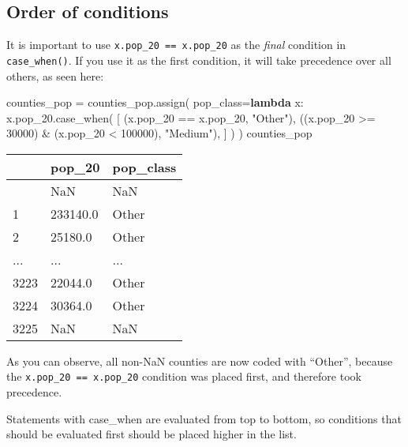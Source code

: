 \documentclass[
  letterpaper,
  DIV=11,
  numbers=noendperiod]{scrreprt}
\newenvironment{Shaded}{\begin{snugshade}}{\end{snugshade}}
\newcommand{\DecValTok}[1]{\textcolor[rgb]{0.68,0.00,0.00}{#1}}
\newcommand{\KeywordTok}[1]{\textcolor[rgb]{0.00,0.23,0.31}{\textbf{#1}}}
\newcommand{\NormalTok}[1]{\textcolor[rgb]{0.00,0.23,0.31}{#1}}
\newcommand{\OperatorTok}[1]{\textcolor[rgb]{0.37,0.37,0.37}{#1}}
\newcommand{\StringTok}[1]{\textcolor[rgb]{0.13,0.47,0.30}{#1}}
\begin{document}
\begin{tcolorbox}[enhanced jigsaw, colframe=quarto-callout-caution-color-frame, opacityback=0, titlerule=0mm, bottomrule=.15mm, breakable, leftrule=.75mm, colbacktitle=quarto-callout-caution-color!10!white, title=\textcolor{quarto-callout-caution-color}{\faFire}\hspace{0.5em}{Watch Out}, rightrule=.15mm, coltitle=black, opacitybacktitle=0.6, colback=white, left=2mm, arc=.35mm, toptitle=1mm, bottomtitle=1mm, toprule=.15mm]

\subsection{Order of conditions}\label{order-of-conditions}

It is important to use \texttt{x.pop\_20\ ==\ x.pop\_20} as the
\emph{final} condition in \texttt{case\_when()}. If you use it as the
first condition, it will take precedence over all others, as seen here:

\begin{Shaded}
\begin{Highlighting}[]
\NormalTok{counties\_pop }\OperatorTok{=}\NormalTok{ counties\_pop.assign(}
\NormalTok{    pop\_class}\OperatorTok{=}\KeywordTok{lambda}\NormalTok{ x: x.pop\_20.case\_when(}
\NormalTok{        [}
\NormalTok{            (x.pop\_20 }\OperatorTok{==}\NormalTok{ x.pop\_20, }\StringTok{"Other"}\NormalTok{),}
\NormalTok{            ((x.pop\_20 }\OperatorTok{\textgreater{}=} \DecValTok{30000}\NormalTok{) }\OperatorTok{\&}\NormalTok{ (x.pop\_20 }\OperatorTok{\textless{}} \DecValTok{100000}\NormalTok{), }\StringTok{"Medium"}\NormalTok{),}
\NormalTok{        ]}
\NormalTok{    )}
\NormalTok{)}
\NormalTok{counties\_pop}
\end{Highlighting}
\end{Shaded}

\begin{longtable}[]{@{}lll@{}}
\toprule\noalign{}
& pop\_20 & pop\_class \\
\midrule\noalign{}
\endhead
\bottomrule\noalign{}
\endlastfoot
0 & NaN & NaN \\
1 & 233140.0 & Other \\
2 & 25180.0 & Other \\
... & ... & ... \\
3223 & 22044.0 & Other \\
3224 & 30364.0 & Other \\
3225 & NaN & NaN \\
\end{longtable}

As you can observe, all non-NaN counties are now coded with ``Other'',
because the \texttt{x.pop\_20\ ==\ x.pop\_20} condition was placed
first, and therefore took precedence.

Statements with case\_when are evaluated from top to bottom, so
conditions that should be evaluated first should be placed higher in the
list.

\end{tcolorbox}
\end{document}
